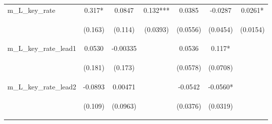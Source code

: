 \documentclass[]{article}
\begin{document}
\begin{center}
\begin{tabular}{lcccccc}
m\_L\_key\_rate & 0.317* & 0.0847 & 0.132*** & 0.0385 & -0.0287 & 0.0261* \\
\vspace{4pt} & \begin{footnotesize}(0.163)\end{footnotesize} & \begin{footnotesize}(0.114)\end{footnotesize} & \begin{footnotesize}(0.0393)\end{footnotesize} & \begin{footnotesize}(0.0556)\end{footnotesize} & \begin{footnotesize}(0.0454)\end{footnotesize} & \begin{footnotesize}(0.0154)\end{footnotesize} \\
m\_L\_key\_rate\_lead1 & 0.0530 & -0.00335 &  & 0.0536 & 0.117* &  \\
\vspace{4pt} & \begin{footnotesize}(0.181)\end{footnotesize} & \begin{footnotesize}(0.173)\end{footnotesize} & \begin{footnotesize}\end{footnotesize} & \begin{footnotesize}(0.0578)\end{footnotesize} & \begin{footnotesize}(0.0708)\end{footnotesize} & \begin{footnotesize}\end{footnotesize} \\
m\_L\_key\_rate\_lead2 & -0.0893 & 0.00471 &  & -0.0542 & -0.0560* &  \\
\vspace{4pt} & \begin{footnotesize}(0.109)\end{footnotesize} & \begin{footnotesize}(0.0963)\end{footnotesize} & \begin{footnotesize}\end{footnotesize} & \begin{footnotesize}(0.0376)\end{footnotesize} & \begin{footnotesize}(0.0319)\end{footnotesize} & \begin{footnotesize}\end{footnotesize} \\

\end{tabular}
\end{center}
\end{document}
